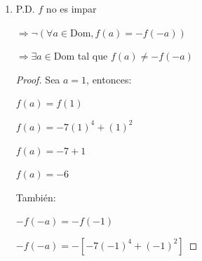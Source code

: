 \documentclass{article}
\begin{document}
\begin{enumerate}
\begin{enumerate}
\begin{enumerate}
                \(\Rightarrow \forall a \in \text{Dom}, f(a) = f(-a)\)
                
                \begin{proof} Sea \(a \in \text{Dom}\), entonces:
                
                \(f(a) = -7a^4 + a^2\)
                
                \(f(a) = -a^2(7a^2 - 1)\)
                \vspace{\baselineskip}
                
                También:
                
                \(f(-a) = -7(-a)^4 + (-a)^2\)
                
                \(f(-a) = -7a^4 + a^2\)
                
                \(f(-a) = -a^2(7a^2 - 1)\)
                \vspace{\baselineskip}
                
                Por tanto:
                
                \(f(a) = f(-a)\)
                \end{proof}
                
                \item[2.] P.D. \( f \) no es impar
                
                \(\Rightarrow \neg(\forall a \in \text{Dom}, f(a) = -f(-a))\)
                
                \(\Rightarrow \exists a \in \text{Dom}\) tal que \(f(a) \neq -f(-a)\)
                
                \begin{proof} Sea \(a = 1\), entonces:
                
                \(f(a) = f(1)\)
                
                \(f(a) = -7(1)^4 + (1)^2\)
                
                \(f(a) = -7 + 1\)
                
                \(f(a) = -6\)
                
                \vspace{\baselineskip}
                
                También:
                
                \(-f(-a) = -f(-1)\)
                
                \(-f(-a) = -[-7(-1)^4 + (-1)^2]\)
                

\end{proof}
\end{enumerate}
\end{enumerate}
\end{enumerate}
\end{document}
